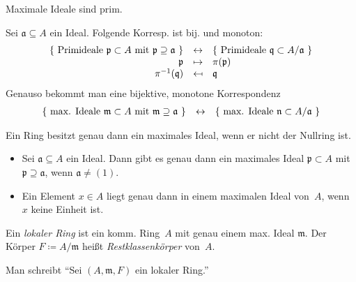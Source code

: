 \documentclass{cheat-sheet}
\newcommand{\aaa}{\mathfrak{a}}
\newcommand{\ppp}{\mathfrak{p}}
\newcommand{\qqq}{\mathfrak{q}}
\newcommand{\mmm}{\mathfrak{m}}
\newcommand{\nnn}{\mathfrak{n}}
\begin{document}
\begin{kor}
  Maximale Ideale sind prim.
\end{kor}

\begin{prop}
  Sei $\aaa \subseteq A$ ein Ideal.
  Folgende Korresp. ist bij. und monoton:
  \[
    \begin{array}{r c l}
      \{ \text{ Primideale $\ppp \subset A$ mit $\ppp \supseteq \aaa$ } \} & \leftrightarrow & \{ \text{ Primideale $\qqq \subset A/\aaa$ } \} \\
      \ppp & \mapsto & \pi(\ppp) \\
      \pi^{-1}(\qqq) & \mapsfrom & \qqq
    \end{array}
  \]
  Genauso bekommt man eine bijektive, monotone Korrespondenz
  \[
    \begin{array}{r c l}
      \{ \text{ max. Ideale $\mmm \subset A$ mit $\mmm \supseteq \aaa$ } \} & \leftrightarrow & \{ \text{ max. Ideale $\nnn \subset A/\aaa$ } \}
    \end{array}
  \]
\end{prop}


\begin{prop}
  Ein Ring besitzt genau dann ein maximales Ideal, wenn er nicht der Nullring ist.
\end{prop}

\begin{kor}
  \begin{itemize}
    \item Sei $\aaa \subseteq A$ ein Ideal.
    Dann gibt es genau dann ein maximales Ideal $\ppp \subset A$ mit $\ppp \supseteq \aaa$, wenn $\aaa \neq (1)$.
    \item Ein Element $x \in A$ liegt genau dann in einem maximalen Ideal von~$A$, wenn~$x$ keine Einheit ist.
  \end{itemize}
\end{kor}


\begin{defn}
  Ein \emph{lokaler Ring} ist ein komm. Ring~$A$ mit genau einem max. Ideal $\mmm$.
  Der Körper $F \coloneqq A/\mmm$ heißt \emph{Restklassenkörper} von~$A$.
\end{defn}

\begin{nota}
  Man schreibt "`Sei $(A, \mmm, F)$ ein lokaler Ring."'
\end{nota}
\end{document}
